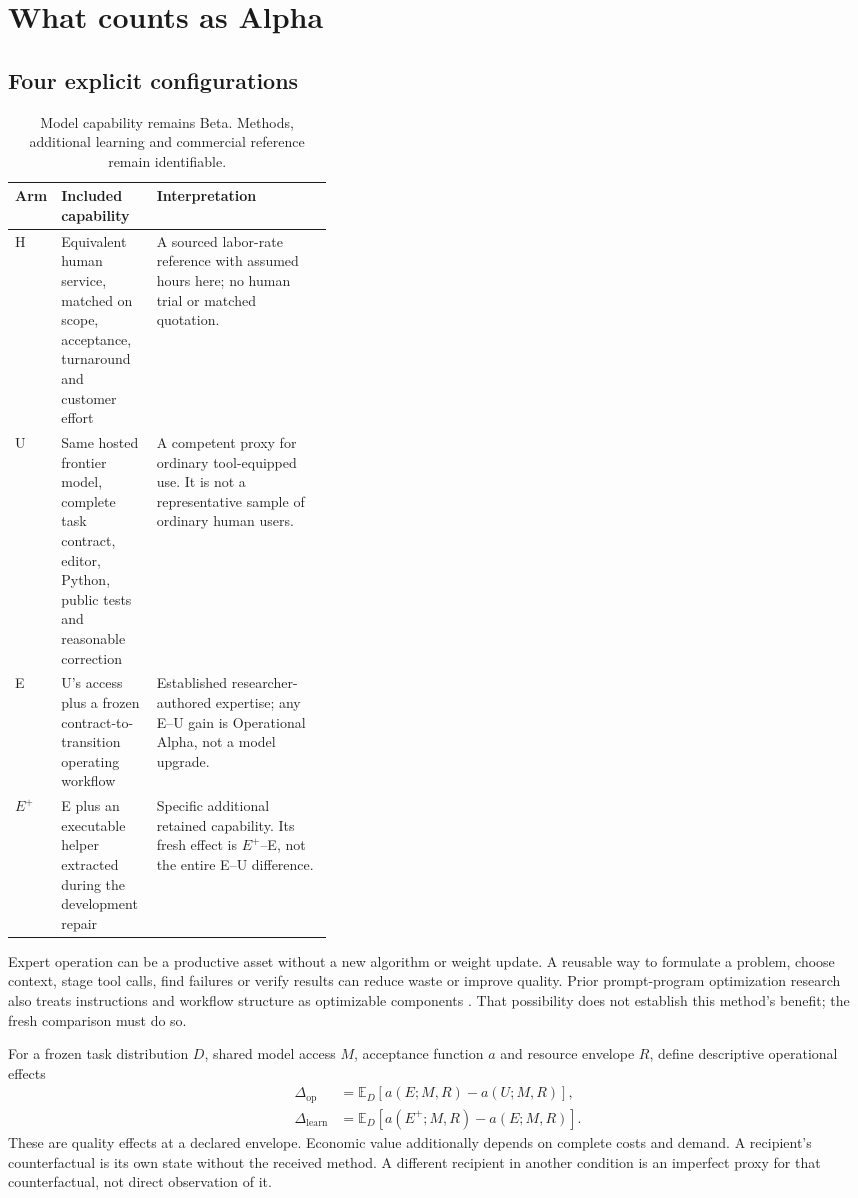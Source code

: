 \documentclass[11pt,letterpaper]{article}
\newcommand{\Eplus}{\ensuremath{E^{+}}}
\begin{document}
\section{What counts as Alpha}
\subsection{Four explicit configurations}
\begin{table}[H]\small
\begin{tabularx}{\linewidth}{@{}p{0.07\linewidth}p{0.30\linewidth}X@{}}\toprule
Arm & Included capability & Interpretation \\ \midrule
H & Equivalent human service, matched on scope, acceptance, turnaround and customer effort & A sourced labor-rate reference with assumed hours here; no human trial or matched quotation. \\
U & Same hosted frontier model, complete task contract, editor, Python, public tests and reasonable correction & A competent proxy for ordinary tool-equipped use. It is not a representative sample of ordinary human users. \\
E & U's access plus a frozen contract-to-transition operating workflow & Established researcher-authored expertise; any E--U gain is Operational Alpha, not a model upgrade. \\
\Eplus & E plus an executable helper extracted during the development repair & Specific additional retained capability. Its fresh effect is \Eplus--E, not the entire E--U difference. \\ \bottomrule
\end{tabularx}
\caption{Model capability remains Beta. Methods, additional learning and commercial reference remain identifiable.}
\end{table}

Expert operation can be a productive asset without a new algorithm or weight update. A reusable way to formulate a problem, choose context, stage tool calls, find failures or verify results can reduce waste or improve quality. Prior prompt-program optimization research also treats instructions and workflow structure as optimizable components \cite{dspy,textgrad}. That possibility does not establish this method's benefit; the fresh comparison must do so.

For a frozen task distribution $D$, shared model access $M$, acceptance function $a$ and resource envelope $R$, define descriptive operational effects
\begin{align}
\Delta_{\mathrm{op}} &= \mathbb{E}_{D}[a(E;M,R)-a(U;M,R)],\\
\Delta_{\mathrm{learn}} &= \mathbb{E}_{D}[a(E^{+};M,R)-a(E;M,R)].
\end{align}
These are quality effects at a declared envelope. Economic value additionally depends on complete costs and demand. A recipient's counterfactual is its own state without the received method. A different recipient in another condition is an imperfect proxy for that counterfactual, not direct observation of it.
\end{document}
